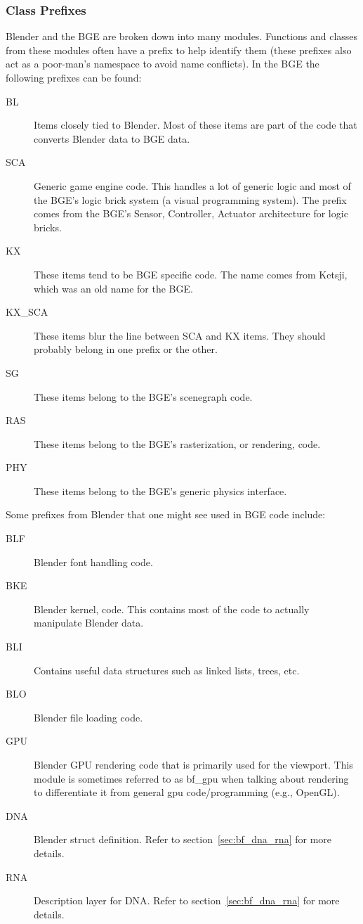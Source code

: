 \subsubsection{Class Prefixes}
Blender and the BGE are broken down into many modules.
Functions and classes from these modules often have a prefix to help identify them (these prefixes also act as a poor-man's namespace to avoid name conflicts).
In the BGE the following prefixes can be found:

\begin{description}
 \item[BL] Items closely tied to Blender. Most of these items are part of the code that converts Blender data to BGE data.
 \item[SCA] Generic game engine code. This handles a lot of generic logic and most of the BGE's logic brick system (a visual programming system). The prefix comes from the BGE's Sensor, Controller, Actuator architecture for logic bricks.
 \item [KX] These items tend to be BGE specific code. The name comes from Ketsji, which was an old name for the BGE.
 \item [KX\_SCA] These items blur the line between SCA and KX items. They should probably belong in one prefix or the other.
 \item [SG] These items belong to the BGE's scenegraph code.
 \item [RAS] These items belong to the BGE's rasterization, or rendering, code.
 \item [PHY] These items belong to the BGE's generic physics interface.
\end{description}

Some prefixes from Blender that one might see used in BGE code include:

\begin{description}
 \item [BLF] Blender font handling code.
 \item [BKE] Blender kernel, code. This contains most of the code to actually manipulate Blender data.
 \item [BLI] Contains useful data structures such as linked lists, trees, etc.
 \item [BLO] Blender file loading code.
 \item [GPU] Blender GPU rendering code that is primarily used for the viewport. This module is sometimes referred to as bf\_gpu when talking about rendering to differentiate it from general gpu code/programming (e.g., OpenGL).
 \item [DNA] Blender struct definition. Refer to section~\ref{sec:bf_dna_rna} for more details.
 \item [RNA] Description layer for DNA. Refer to section~\ref{sec:bf_dna_rna} for more details.
\end{description}

